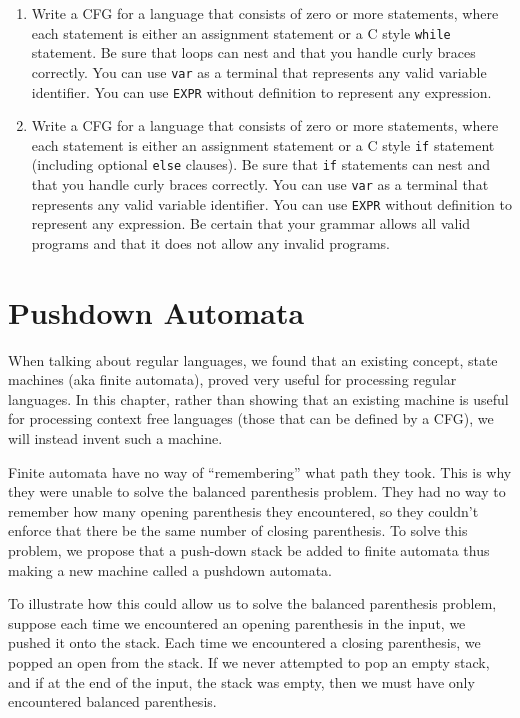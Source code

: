 \documentclass[letterpaper,12pt,openany,reqno]{book}%
\newcommand{\code}[1] {\lstinline[breaklines=yes,breakatwhitespace=yes]{#1}}
\begin{document}
\begin{enumerate}
\item Write a CFG for a language that consists of zero or more statements, where each statement is either an assignment statement or a C style \code{while} statement. Be sure that loops can nest and that you handle curly braces correctly. You can use \code{var} as a terminal that represents any valid variable identifier. You can use \code{EXPR} without definition to represent any expression.
\item Write a CFG for a language that consists of zero or more statements, where each statement is either an assignment statement or a C style \code{if} statement (including optional \code{else} clauses). Be sure that \code{if} statements can nest and that you handle curly braces correctly. You can use \code{var} as a terminal that represents any valid variable identifier. You can use \code{EXPR} without definition to represent any expression. Be certain that your grammar allows all valid programs and that it does not allow any invalid programs.

\end{enumerate}

\chapter{Pushdown Automata}
When talking about regular languages, we found that an existing concept, state machines (aka finite automata), proved very useful for processing regular languages. In this chapter, rather than showing that an existing machine is useful for processing context free languages (those that can be defined by a CFG), we will instead invent such a machine.

Finite automata have no way of ``remembering'' what path they took. This is why they were unable to solve the balanced parenthesis problem. They had no way to remember how many opening parenthesis they encountered, so they couldn't enforce that there be the same number of closing parenthesis. To solve this problem, we propose that a push-down stack be added to finite automata thus making a new machine called a pushdown automata.

To illustrate how this could allow us to solve the balanced parenthesis problem, suppose each time we encountered an opening parenthesis in the input, we pushed it onto the stack. Each time we encountered a closing parenthesis, we popped an open from the stack. If we never attempted to pop an empty stack, and if at the end of the input, the stack was empty, then we must have only encountered balanced parenthesis.
\end{document}
